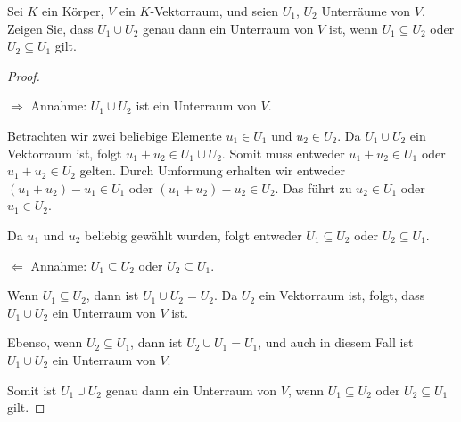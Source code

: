 \documentclass{../problemset}
\author{Michael van Straten}
\begin{document}
\maketitle

\begin{problem}
Sei $K$ ein Körper, $V$ ein $K$-Vektorraum, und seien $U_1$, $U_2$ Unterräume von $V$. Zeigen Sie, dass $U_1 \cup U_2$ genau dann ein Unterraum von $V$ ist, wenn $U_1 \subseteq U_2$ oder $U_2 \subseteq U_1$ gilt.
\begin{proof}
	$ $

	$\Rightarrow$ Annahme: $U_1 \cup U_2$ ist ein Unterraum von $V$.

	Betrachten wir zwei beliebige Elemente $u_1 \in U_1$ und $u_2 \in U_2$.
	Da $U_1 \cup U_2$ ein Vektorraum ist, folgt $u_1 + u_2 \in U_1 \cup U_2$.
	Somit muss entweder $u_1 + u_2 \in U_1$ oder $u_1 + u_2 \in U_2$ gelten.
	Durch Umformung erhalten wir entweder $(u_1 + u_2) - u_1 \in U_1$ oder $(u_1 + u_2) - u_2 \in U_2$.
	Das führt zu $u_2 \in U_1$ oder $u_1 \in U_2$.

	Da $u_1$ und $u_2$ beliebig gewählt wurden, folgt entweder $U_1 \subseteq U_2$ oder $U_2 \subseteq U_1$. \checkmark

	$\Leftarrow$ Annahme: $U_1 \subseteq U_2$ oder $U_2 \subseteq U_1$.

	Wenn $U_1 \subseteq U_2$, dann ist $U_1 \cup U_2 = U_2$.
	Da $U_2$ ein Vektorraum ist, folgt, dass $U_1 \cup U_2$ ein Unterraum von $V$ ist.

	Ebenso, wenn $U_2 \subseteq U_1$, dann ist $U_2 \cup U_1 = U_1$, und auch in diesem Fall ist $U_1 \cup U_2$ ein Unterraum von $V$.  \checkmark

	Somit ist $U_1 \cup U_2$ genau dann ein Unterraum von $V$, wenn $U_1 \subseteq U_2$ oder $U_2 \subseteq U_1$ gilt.
\end{proof}
\end{problem}

\pagebreak
\end{document}
